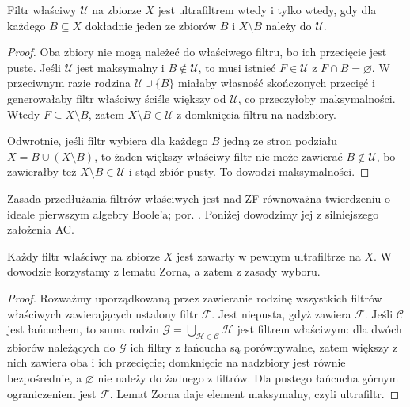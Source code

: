 \begin{lemat}
\label{lem:topog-zwartosc-ultrafiltr-alternatywa}
Filtr właściwy $\mathcal U$ na zbiorze $X$ jest
ultrafiltrem wtedy i tylko wtedy, gdy dla każdego
$B\subseteq X$ dokładnie jeden ze zbiorów
$B$ i $X\setminus B$ należy do $\mathcal U$.
\end{lemat}
\begin{proof}
Oba zbiory nie mogą należeć do właściwego filtru,
bo ich przecięcie jest puste. Jeśli $\mathcal U$
jest maksymalny i $B\notin\mathcal U$, to
musi istnieć $F\in\mathcal U$ z $F\cap B=\varnothing$.
W przeciwnym razie rodzina $\mathcal U\cup\{B\}$
miałaby własność skończonych przecięć i generowałaby
filtr właściwy ściśle większy od $\mathcal U$,
co przeczyłoby maksymalności.
Wtedy $F\subseteq X\setminus B$, zatem
$X\setminus B\in\mathcal U$ z domknięcia filtru
na nadzbiory.

Odwrotnie, jeśli filtr wybiera dla każdego $B$
jedną ze stron podziału $X=B\cup(X\setminus B)$,
to żaden większy właściwy filtr nie może zawierać
$B\notin\mathcal U$, bo zawierałby też
$X\setminus B\in\mathcal U$ i stąd zbiór pusty.
To dowodzi maksymalności.
\end{proof}

Zasada przedłużania filtrów właściwych jest nad ZF równoważna twierdzeniu o ideale pierwszym algebry Boole'a; por. . Poniżej dowodzimy jej z silniejszego założenia AC.

\begin{lemat}
\label{lem:topog-zwartosc-ultrafiltr-zorn}
Każdy filtr właściwy na zbiorze $X$ jest zawarty
w pewnym ultrafiltrze na $X$. W dowodzie korzystamy
z lematu Zorna, a zatem z zasady wyboru.
\end{lemat}
\begin{proof}
Rozważmy uporządkowaną przez zawieranie rodzinę
wszystkich filtrów właściwych zawierających ustalony
filtr $\mathcal F$. Jest niepusta, gdyż zawiera
$\mathcal F$. Jeśli $\mathcal C$ jest łańcuchem,
to suma rodzin $\mathcal G=\bigcup_{\mathcal H\in\mathcal C}
\mathcal H$ jest filtrem właściwym: dla dwóch zbiorów
należących do $\mathcal G$ ich filtry z łańcucha
są porównywalne, zatem większy z nich zawiera oba
i ich przecięcie; domknięcie na nadzbiory
jest równie bezpośrednie, a $\varnothing$ nie należy
do żadnego z filtrów. Dla pustego łańcucha
górnym ograniczeniem jest $\mathcal F$.
Lemat Zorna daje element maksymalny, czyli ultrafiltr.
\end{proof}

